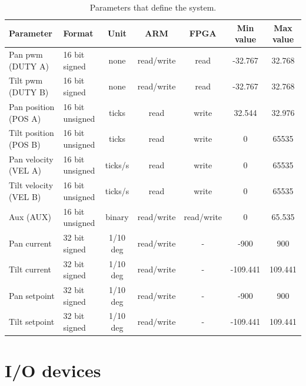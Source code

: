 \begin{table}[htb]				
	\centering
	\begin{tabular}{llccccc}			
	Parameter & Format & Unit & ARM & FPGA & Min value & Max value\\		
	\midrule										
Pan pwm (DUTY A) &16 bit signed & none & read/write & read & -32.767 &  32.768  \\
Tilt pwm (DUTY B) & 16 bit signed  & none&read/write & read & -32.767 &  32.768 \\
Pan position (POS A) & 16 bit unsigned&ticks & read & write & 32.544 & 32.976 \\
Tilt position (POS B) & 16 bit unsigned&ticks & read & write & 0 & 65535 \\
Pan velocity (VEL A) & 16 bit unsigned&ticks/s & read & write & 0 & 65535 \\
Tilt velocity (VEL B) & 16 bit unsigned & ticks/s&read & write & 0 & 65535 \\
Aux (AUX) & 16 bit unsigned &binary& read/write & read/write & 0 & 65.535 \\
Pan current & 32 bit signed & 1/10 deg & read/write & - & -900 & 900 \\
Tilt current  & 32 bit signed & 1/10 deg & read/write & - & -109.441 & 109.441 \\
Pan setpoint  & 32 bit signed & 1/10 deg & read/write & - & -900 & 900 \\
Tilt setpoint  & 32 bit signed & 1/10 deg & read/write & - & -109.441 & 109.441 \\
	\end{tabular}
	\caption{Parameters that define the system.}				
	\label{tab:parameters}			
\end{table}


\section{I/O devices}\label{sec:iodevices}

